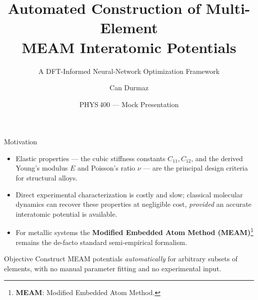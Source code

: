 \documentclass[aspectratio=169, 11pt]{beamer}
\title[MEAM Mock Pitch]{Automated Construction of Multi-Element\\MEAM Interatomic Potentials}
\subtitle{A DFT-Informed Neural-Network Optimization Framework}
\author{Can Durmaz}
\institute{METU --- Department of Physics}
\date{PHYS\,400 --- Mock Presentation}
\begin{document}
\begin{frame}[plain]
\titlepage
\end{frame}

\begin{frame}{Motivation}
\begin{itemize}
  \item Elastic properties --- the cubic stiffness constants $C_{11}, C_{12}$, and the derived Young's modulus $E$ and Poisson's ratio $\nu$ --- are the principal design criteria for structural alloys.
  \item Direct experimental characterization is costly and slow; classical molecular dynamics can recover these properties at negligible cost, \emph{provided} an accurate interatomic potential is available.
  \item For metallic systems the \textbf{Modified Embedded Atom Method (MEAM)}\footnote{\tiny\textbf{MEAM}: Modified Embedded Atom Method.} remains the de-facto standard semi-empirical formalism.
\end{itemize}

\vspace{0.6em}
\begin{block}{Objective}
Construct MEAM potentials \emph{automatically} for arbitrary subsets of elements, with no manual parameter fitting and no experimental input.
\end{block}
\end{frame}
\end{document}
